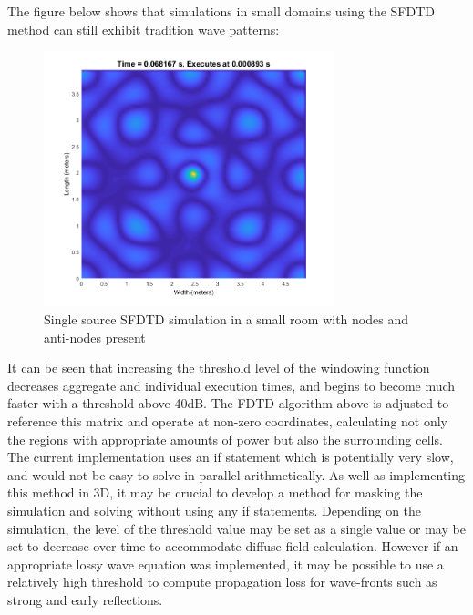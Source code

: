 The figure below shows that simulations in small domains using the SFDTD method can still exhibit tradition wave patterns:\\

\begin{figure}[H]
\centering
  \includegraphics[width=0.75\textwidth]{./graphics/sfdtd with wave shapes.png}
  \caption{Single source SFDTD simulation in a small room with nodes and anti-nodes present}
\end{figure}

It can be seen that increasing the threshold level of the windowing function decreases aggregate and individual execution times, and begins to become much faster with a threshold above 40dB.
The FDTD algorithm above is adjusted to reference this matrix and operate at non-zero coordinates, calculating not only the regions with appropriate amounts of power but also the surrounding cells. The current implementation uses an if statement which is potentially very slow, and would not be easy to solve in parallel arithmetically. As well as implementing this method in 3D, it may be crucial to develop a method for masking the simulation and solving without using any if statements. Depending on the simulation, the level of the threshold value may be set as a single value or may be set to decrease over time to accommodate diffuse field calculation. However if an appropriate lossy wave equation was implemented, it may be possible to use a relatively high threshold to compute propagation loss for wave-fronts such as strong and early reflections.\\












